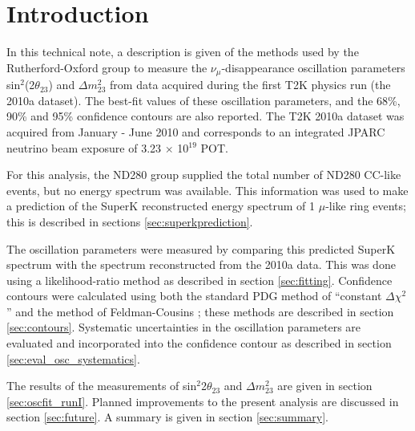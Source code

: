 \clearpage

\section {Introduction }

In this technical note, a description is given of the methods used by the 
Rutherford-Oxford group to measure the $\nu_{\mu}$-disappearance oscillation parameters
sin$^{2}$(2$\theta_{23}$) and $\Delta m^{2}_{23}$ from data acquired during the first T2K physics run (the 2010a dataset). 
The best-fit values of these oscillation parameters, and the 68\%, 90\% and 95\% confidence contours are also reported. 
The T2K 2010a dataset was acquired from January - June 2010 and corresponds to an integrated 
JPARC neutrino beam exposure of 3.23 $\times$ 10$^{19}$ POT. 

For this analysis, the ND280 group supplied the total number of ND280 CC-like events, but no energy spectrum was available. 
This information was used to make a prediction of the SuperK reconstructed energy spectrum of 1 $\mu$-like ring events; 
this is described in sections \ref{sec:superkprediction}.

The oscillation parameters were measured by comparing this predicted SuperK spectrum with the spectrum reconstructed from the 2010a data. 
This was done using a likelihood-ratio method as described in section \ref{sec:fitting}. Confidence contours were calculated using 
both the standard PDG method of ``constant $\Delta \chi^{2}$'' \cite{RevPartPhys} and the method of Feldman-Cousins \cite{FeldmanCousins}; 
these methods are described in section \ref{sec:contours}. 
Systematic uncertainties in the oscillation parameters are evaluated and incorporated into the confidence contour
as described in section \ref{sec:eval_osc_systematics}.

The results of the measurements of sin$^{2}$2$\theta_{23}$ and $\Delta m^{2}_{23}$ are given in section \ref{sec:oscfit_runI}. 
Planned improvements to the present analysis are discussed in section \ref{sec:future}.
A summary is given in section \ref{sec:summary}.  


